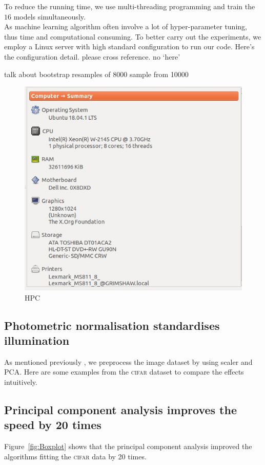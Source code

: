 \documentclass[12pt]{article} %
\newcommand{\chenc}[1]{\pdfcomment[author=Chen,color={1 0.5 0.5},subject={#1}]{#1}}
\begin{document}
To reduce the running time, we use multi-threading programming and train the $16$ models simultaneously. \\

As machine learning algorithm often involve a lot of hyper-parameter tuning, thus time and computational consuming. To better carry out the experiments, we employ a Linux server with high standard configuration to run our code. Here's the configuration detail. {\color{red} please cross reference. no `here'}

talk about bootstrap resamples of 8000 sample from 10000

\begin{figure}[tbh]
    \centering
	\includegraphics[scale=.7]{hpc}
	\caption{HPC}
	\label{fig:HPC}
\end{figure}

\subsection{Photometric normalisation standardises illumination}
As mentioned previously \chenc{cross reference}, we preprocess the image dataset by using scaler and PCA. Here are some examples from the \textsc{cifar} dataset to compare the effects intuitively.
\subsection{Principal component analysis improves the speed by 20 times}
Figure~\ref{fig:Boxplot} shows that the principal component analysis improved the algorithms fitting the \textsc{cifar} data by 20 times.
\end{document}
